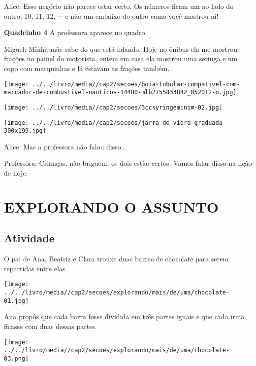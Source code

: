 \documentclass[a4,12pt]{book}
\begin{document}
\begin{imagem*}[breakable]{}{}
  Alice: Esse negócio não parece estar certo. Os números ficam um ao lado do outro, 10, 11, 12,   $\cdots$   e não um embaixo do outro como você mostrou aí!  
  
  {\bf Quadrinho 4}  
  A professora aparece no quadro  
  
  Miguel: Minha mãe sabe do que está falando. Hoje no ônibus ela me mostrou frações no painel do motorista, ontem em casa ela mostrou uma seringa e um copo com marquinhas e lá estavam as frações também.  
  
    \texttt{[image: ../../livro/media//cap2/secoes/boia-tubular-compativel-com-marcador-de-combustivel-nauticos-14480-mlb2755833842\_052012-o.jpg]}  
  
    \texttt{[image: ../../livro/media//cap2/secoes/3ccsyringeminim-02.jpg]}  
  
    \texttt{[image: ../../livro/media//cap2/secoes/jarra-de-vidro-graduada-300x199.jpg]}  
  
  
  Alice: Mas a professora não falou disso...  
  
  Professora: Crianças, não briguem, os dois estão certos. Vamos falar disso na lição de hoje.  
  
\end{imagem*}




\section*{EXPLORANDO O ASSUNTO }



\subsection{Atividade}

O pai de Ana, Beatriz e Clara trouxe duas barras de chocolate para serem repartidas entre elas.
\begin{center}
\texttt{[image: ../../livro/media//cap2/secoes/explorando/mais/de/uma/chocolate-01.jpg]} 
\end{center}

Ana propôs que cada barra fosse dividida em três partes iguais e que cada irmã ficasse com duas dessas partes.
\begin{center}
\texttt{[image: ../../livro/media//cap2/secoes/explorando/mais/de/uma/chocolate-03.png]} 
\end{center}
\end{document}

